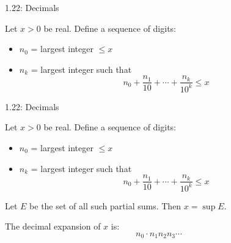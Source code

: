 \documentclass[aspectratio=169,12pt,t]{beamer}
\begin{document}
{%
\begin{frame}{1.22: Decimals}
  \begin{hlbox}
    Let $x > 0$ be real. Define a sequence of digits:

    \vspace{0.5em}
    \begin{itemize}
      \item $n_0$ = largest integer $\leq x$ 
      \item $n_k$ = largest integer such that
      \begin{equation}
        n_0 + \frac{n_1}{10} + \cdots + \frac{n_k}{10^k} \leq x \tag{5}
      \end{equation}
    \end{itemize}
  \end{hlbox}

\end{frame}

\begin{frame}{1.22: Decimals}
  \begin{hlbox}
    Let $x > 0$ be real. Define a sequence of digits:

    \vspace{0.5em}
    \begin{itemize}
      \item $n_0$ = largest integer $\leq x$ 
      \item $n_k$ = largest integer such that
      \begin{equation}
        n_0 + \frac{n_1}{10} + \cdots + \frac{n_k}{10^k} \leq x \tag{5}
      \end{equation}
    \end{itemize}

    \vspace{0.3em}
    Let $E$ be the set of all such partial sums. Then $x = \sup E$.

    \vspace{0.3em}
    The \alert{decimal expansion} of $x$ is:
    \begin{equation}
      n_0 \cdot n_1 n_2 n_3 \cdots \tag{6}
    \end{equation}
  \end{hlbox}


\end{frame}}
\end{document}

